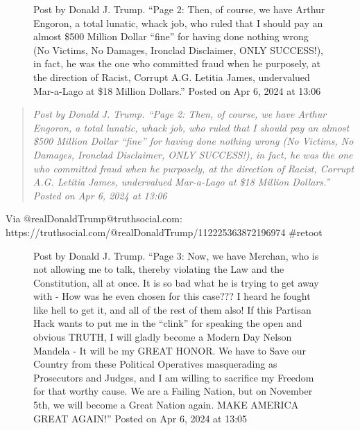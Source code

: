 \begin{figure}
\centering
{}
\caption{Post by Donald J. Trump. ``Page 2: Then, of course, we have
Arthur Engoron, a total lunatic, whack job, who ruled that I should pay
an almost \$500 Million Dollar ``fine'' for having done nothing wrong
(No Victims, No Damages, Ironclad Disclaimer, ONLY SUCCESS!), in fact,
he was the one who committed fraud when he purposely, at the direction
of Racist, Corrupt A.G. Letitia James, undervalued Mar-a-Lago at \$18
Million Dollars.'' Posted on Apr 6, 2024 at 13:06}
\end{figure}

\begin{quote}
\emph{Post by Donald J. Trump. ``Page 2: Then, of course, we have Arthur
Engoron, a total lunatic, whack job, who ruled that I should pay an
almost \$500 Million Dollar ``fine'' for having done nothing wrong (No
Victims, No Damages, Ironclad Disclaimer, ONLY SUCCESS!), in fact, he
was the one who committed fraud when he purposely, at the direction of
Racist, Corrupt A.G. Letitia James, undervalued Mar-a-Lago at \$18
Million Dollars.'' Posted on Apr 6, 2024 at 13:06}
\end{quote}

Via @realDonaldTrump@truthsocial.com:
https://truthsocial.com/@realDonaldTrump/112225363872196974 \#retoot

\begin{figure}
\centering
{}
\caption{Post by Donald J. Trump. ``Page 3: Now, we have Merchan, who is
not allowing me to talk, thereby violating the Law and the Constitution,
all at once. It is so bad what he is trying to get away with - How was
he even chosen for this case??? I heard he fought like hell to get it,
and all of the rest of them also! If this Partisan Hack wants to put me
in the ``clink'' for speaking the open and obvious TRUTH, I will gladly
become a Modern Day Nelson Mandela - It will be my GREAT HONOR. We have
to Save our Country from these Political Operatives masquerading as
Prosecutors and Judges, and I am willing to sacrifice my Freedom for
that worthy cause. We are a Failing Nation, but on November 5th, we will
become a Great Nation again. MAKE AMERICA GREAT AGAIN!'' Posted on Apr
6, 2024 at 13:05}
\end{figure}

